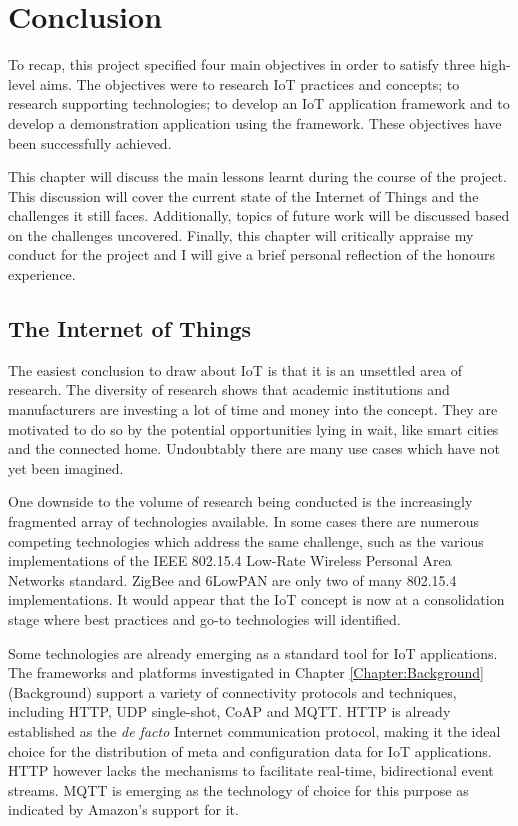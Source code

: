 \chapter{Conclusion}
  To recap, this project specified four main objectives in order to satisfy three high-level aims. The objectives were to research IoT practices and concepts; to research supporting technologies; to develop an IoT application framework and to develop a demonstration application using the framework. These objectives have been successfully achieved.

  This chapter will discuss the main lessons learnt during the course of the project. This discussion will cover the current state of the Internet of Things and the challenges it still faces. Additionally, topics of future work will be discussed based on the challenges uncovered. Finally, this chapter will critically appraise my conduct for the project and I will give a brief personal reflection of the honours experience.

  \section{The Internet of Things}
    The easiest conclusion to draw about IoT is that it is an unsettled area of research. The diversity of research shows that academic institutions and manufacturers are investing a lot of time and money into the concept. They are motivated to do so by the potential opportunities lying in wait, like smart cities and the connected home. Undoubtably there are many use cases which have not yet been imagined.

    One downside to the volume of research being conducted is the increasingly fragmented array of technologies available. In some cases there are numerous competing technologies which address the same challenge, such as the various implementations of the IEEE 802.15.4 Low-Rate Wireless Personal Area Networks standard. ZigBee and 6LowPAN are only two of many 802.15.4 implementations. It would appear that the IoT concept is now at a consolidation stage where best practices and go-to technologies will identified.

    Some technologies are already emerging as a standard tool for IoT applications. The frameworks and platforms investigated in Chapter \ref{Chapter:Background} (Background) support a variety of connectivity protocols and techniques, including HTTP, UDP single-shot, CoAP and MQTT. HTTP is already established as the \textit{de facto} Internet communication protocol, making it the ideal choice for the distribution of meta and configuration data for IoT applications. HTTP however lacks the mechanisms to facilitate real-time, bidirectional event streams. MQTT is emerging as the technology of choice for this purpose as indicated by Amazon's support for it.

